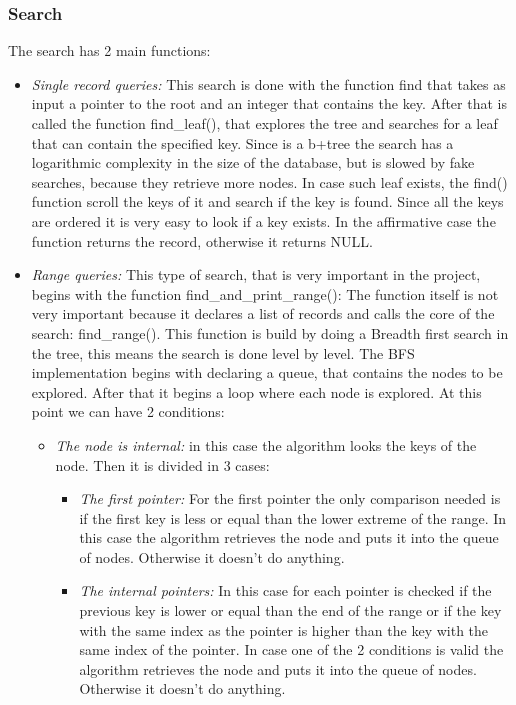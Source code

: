 \subsubsection{Search}
The search has 2 main functions:
\begin{itemize}
    \item \emph{Single record queries:} This search is done with the function find that takes as input a pointer to the root and an integer that contains the key. After that is called the function find\_leaf(), that explores the tree and searches for a leaf that can contain the specified key. Since is a b+tree the search has a logarithmic complexity in the size of the database, but is slowed by fake searches, because they retrieve more nodes.
    In case such leaf exists, the find() function scroll the keys of it and search if the key is found. Since all the keys are ordered it is very easy to look if a key exists. In the affirmative case the function returns the record, otherwise it returns NULL.
    \item \emph{Range queries:} This type of search, that is very important in the project, begins with the function find\_and\_print\_range(): The function itself is not very important because it declares a list of records and calls the core of the search: find\_range(). This function is build by doing a Breadth first search in the tree, this means the search is done level by level. The BFS implementation begins with declaring a queue, that contains the nodes to be explored. After that it begins a loop where each node is explored. At this point we can have 2 conditions:
    \begin{itemize}
        \item \emph{The node is internal:} in this case the algorithm looks the keys of the node. Then it is divided in 3 cases:
        \begin{itemize}
            \item \emph{The first pointer:} For the first pointer the only comparison needed is if the first key is less or equal than the lower extreme of the range. In this case the algorithm retrieves the node and puts it into the queue of nodes. Otherwise it doesn't do anything.
            \item \emph{The internal pointers:} In this case for each pointer is checked if the previous key is lower or equal than the end of the range or if the key with the same index as the pointer is higher than the key with the same index of the pointer. In case one of the 2 conditions is valid the algorithm retrieves the node and puts it into the queue of nodes. Otherwise it doesn't do anything.

\end{itemize}
\end{itemize}
\end{itemize}
